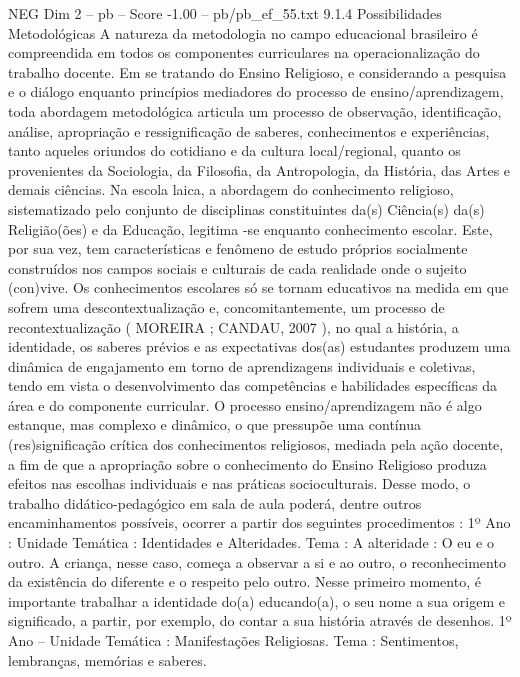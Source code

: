 \begin{textsample}{NEG Dim 2 – pb – Score -1.00 – pb/pb\_ef\_55.txt}  \label{ex:f2_neg_013}
9.1.4 Possibilidades Metodológicas A natureza da metodologia no campo educacional brasileiro é compreendida em todos os componentes curriculares na operacionalização do trabalho docente.
Em se tratando do Ensino Religioso, e considerando a pesquisa e o diálogo enquanto princípios mediadores do processo de ensino/aprendizagem, toda abordagem metodológica articula um processo de observação, identificação, análise, apropriação e ressignificação de saberes, conhecimentos e experiências, tanto aqueles oriundos do cotidiano e da cultura local/regional, quanto os provenientes da Sociologia, da Filosofia, da Antropologia, da História, das Artes e demais ciências.
Na escola laica, a abordagem do conhecimento religioso, sistematizado pelo conjunto de disciplinas constituintes da(s) Ciência(s) da(s) Religião(ões) e da Educação, legitima -se enquanto conhecimento escolar.
Este, por sua vez, tem características e fenômeno de estudo próprios socialmente construídos nos campos sociais e culturais de cada realidade onde o sujeito (con)vive.
Os conhecimentos escolares só se tornam educativos na medida em que sofrem uma descontextualização e, concomitantemente, um processo de recontextualização ( MOREIRA ; CANDAU, 2007 ), no qual a história, a identidade, os saberes prévios e as expectativas dos(as) estudantes produzem uma dinâmica de engajamento em torno de aprendizagens individuais e coletivas, tendo em vista o desenvolvimento das competências e habilidades específicas da área e do componente curricular.
O processo ensino/aprendizagem não é algo estanque, mas complexo e dinâmico, o que pressupõe uma contínua (res)significação crítica dos conhecimentos religiosos, mediada pela ação docente, a fim de que a apropriação sobre o conhecimento do Ensino Religioso produza efeitos nas escolhas individuais e nas práticas socioculturais.
Desse modo, o trabalho didático-pedagógico em sala de aula poderá, dentre outros encaminhamentos possíveis, ocorrer a partir dos seguintes procedimentos : 1º Ano : Unidade Temática : Identidades e Alteridades.
Tema : A alteridade : O eu e o outro.
A criança, nesse caso, começa a observar a si e ao outro, o reconhecimento da existência do diferente e o respeito pelo outro.
Nesse primeiro momento, é importante trabalhar a identidade do(a) educando(a), o seu nome a sua origem e significado, a partir, por exemplo, do contar a sua história através de desenhos. 1º Ano – Unidade Temática : Manifestações Religiosas.
Tema : Sentimentos, lembranças, memórias e saberes.

\end{textsample}
